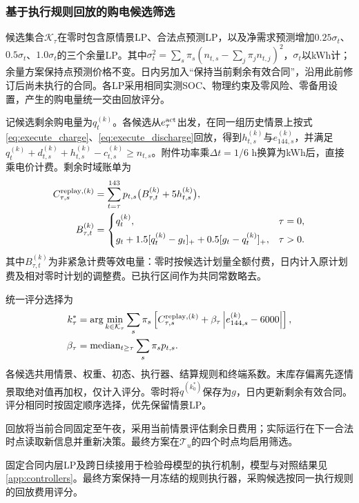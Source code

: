 \subsubsection{基于执行规则回放的购电候选筛选}
\label{sec:q3_candidate_screening}

候选集合$\mathcal K_\tau$在零时包含原情景LP、合法点预测LP，以及净需求预测增加$0.25\sigma_t$、$0.5\sigma_t$、$1.0\sigma_t$的三个余量LP。其中$\sigma_t^2=\sum_s\pi_s(n_{t,s}-\sum_j\pi_jn_{t,j})^2$，$\sigma_t$以kWh计；余量方案保持点预测价格不变。日内另加入“保持当前剩余有效合同”，沿用此前修订后尚未执行的合同。各LP采用相同实测SOC、物理约束及零风险、零备用设置，产生的购电量统一交由回放评分。

记候选剩余购电量为$q_t^{(k)}$。各候选从$e_\tau^{\rm act}$出发，在同一组历史情景上按式\eqref{eq:execute_charge}、\eqref{eq:execute_discharge}回放，得到$h_{t,s}^{(k)}$与$e_{144,s}^{(k)}$，并满足$q_t^{(k)}+d_{t,s}^{(k)}+h_{t,s}^{(k)}-c_{t,s}^{(k)}\ge n_{t,s}$。附件功率乘$\Delta t=1/6$ h换算为kWh后，直接乘电价计费。剩余时域账单为
\begin{align}
 C_{\tau,s}^{\mathrm{replay},(k)}
 &=\sum_{t=\tau}^{143}p_{t,s}\bigl(B_{\tau,t}^{(k)}+5h_{t,s}^{(k)}\bigr),
 \label{eq:q3_replay_bill}\\
 B_{\tau,t}^{(k)}&=
 \begin{cases}
 q_t^{(k)},&\tau=0,\\[1ex]
 g_t+1.5[q_t^{(k)}-g_t]_++0.5[g_t-q_t^{(k)}]_+,&\tau>0.
 \end{cases}\notag
\end{align}
其中$B_{\tau,t}^{(k)}$为非紧急计费等效电量：零时按候选计划量全额付费，日内计入原计划费及相对零时计划的调整费。已执行区间作为共同常数略去。

统一评分选择为
\begin{align}
 k_\tau^*&=\arg\min_{k\in\mathcal K_\tau}\sum_s\pi_s
 \left[C_{\tau,s}^{\mathrm{replay},(k)}
 +\beta_\tau\left|e_{144,s}^{(k)}-6000\right|\right],
 \label{eq:q3_candidate_score}\\
 \beta_\tau&=\operatorname{median}_{t\ge\tau}\sum_s\pi_sp_{t,s}.\notag
\end{align}
各候选共用情景、权重、初态、执行器、结算规则和终端系数。末库存偏离先逐情景取绝对值再加权，仅计入评分。零时将$q^{(k_0^*)}$保存为$g$，日内更新剩余有效合同。评分相同时按固定顺序选择，优先保留情景LP。

回放将当前合同固定至午夜，采用当前情景评估剩余日费用；实际运行在下一合法时点读取新信息并重新决策。最终方案在$\mathcal T_u$的四个时点均启用筛选。

固定合同内层LP及跨日续接用于检验母模型的执行机制，模型与对照结果见\ref{app:controllers}。最终方案保持一月冻结的规则执行器，采购候选按同一执行规则的回放费用评分。

